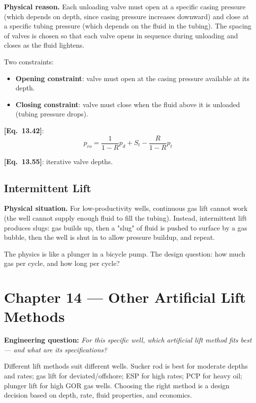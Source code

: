 \documentclass[11pt,a4paper,openany]{book}
\newcommand{\eqrefbook}[1]{\textcolor{blue!60!black}{\textbf{[Eq.~#1]}}}
\begin{document}
\begin{theory}
\textbf{Physical reason.} Each unloading valve must open at a specific
casing pressure (which depends on depth, since casing pressure
increases downward) and close at a specific tubing pressure (which
depends on the fluid in the tubing). The spacing of valves is chosen
so that each valve opens in sequence during unloading and closes as
the fluid lightens.

Two constraints:
\begin{itemize}
  \item \textbf{Opening constraint}: valve must open at the casing
        pressure available at its depth.
  \item \textbf{Closing constraint}: valve must close when the fluid
        above it is unloaded (tubing pressure drops).
\end{itemize}
\end{theory}

\eqrefbook{13.42}:
\begin{equation}
  p_{ro} = \frac{1}{1-R}p_d + S_t - \frac{R}{1-R}p_t
\end{equation}

\eqrefbook{13.55}: iterative valve depths.

\section{Intermittent Lift}

\begin{theory}
\textbf{Physical situation.} For low-productivity wells, continuous
gas lift cannot work (the well cannot supply enough fluid to fill the
tubing). Instead, intermittent lift produces slugs: gas builds up,
then a "slug" of fluid is pushed to surface by a gas bubble, then the
well is shut in to allow pressure buildup, and repeat.

The physics is like a plunger in a bicycle pump. The design question:
how much gas per cycle, and how long per cycle?
\end{theory}

\chapter{Chapter 14 — Other Artificial Lift Methods}

\begin{purpose}
\textbf{Engineering question:} \emph{For this specific well, which
artificial lift method fits best — and what are its specifications?}

Different lift methods suit different wells. Sucker rod is best for
moderate depths and rates; gas lift for deviated/offshore; ESP for
high rates; PCP for heavy oil; plunger lift for high GOR gas wells.
Choosing the right method is a design decision based on depth, rate,
fluid properties, and economics.
\end{purpose}
\end{document}
